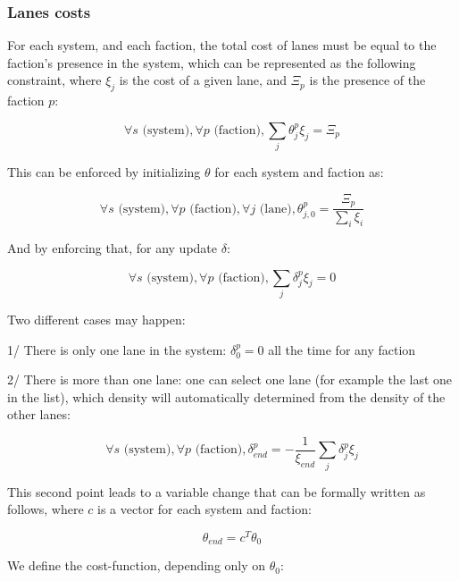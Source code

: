 \documentclass[11pt,a4paper]{article}  %
\begin{document}
\subsubsection{Lanes costs}

For each system, and each faction, the total cost of lanes must be equal to the faction's presence in the system, which can be represented as the following constraint, where $\xi_j$ is the cost of a given lane, and $\Xi_p$ is the presence of the faction $p$:

\begin{equation}
\forall s \text{ (system)}, \forall p \text{ (faction)}, \sum_j \theta_j^p \xi_j = \Xi_p
\end{equation}

This can be enforced by initializing $\theta$ for each system and faction as:

\begin{equation}
\forall s \text{ (system)}, \forall p \text{ (faction)}, \forall j \text{ (lane)}, \theta_{j,0}^p = \dfrac{\Xi_p}{\sum_i \xi_i}
\end{equation}

And by enforcing that, for any update $\delta$:

\begin{equation}
\forall s \text{ (system)}, \forall p \text{ (faction)}, \sum_j \delta_j^p \xi_j = 0
\end{equation}

Two different cases may happen:

1/ There is only one lane in the system: $\delta_0^p = 0$ all the time for any faction

2/ There is more than one lane: one can select one lane (for example the last one in the list), which density will automatically determined from the density of the other lanes:

\begin{equation}
\forall s \text{ (system)}, \forall p \text{ (faction)}, \delta_{end}^p = - \dfrac{1}{\xi_{end}} \sum_j \delta_j^p \xi_j
\end{equation}

This second point leads to a variable change that can be formally written as follows, where $c$ is a vector for each system and faction:

\begin{equation}
\theta_{end} = c^T \theta_0
\end{equation}

We define the cost-function, depending only on $\theta_0$:
\end{document}
